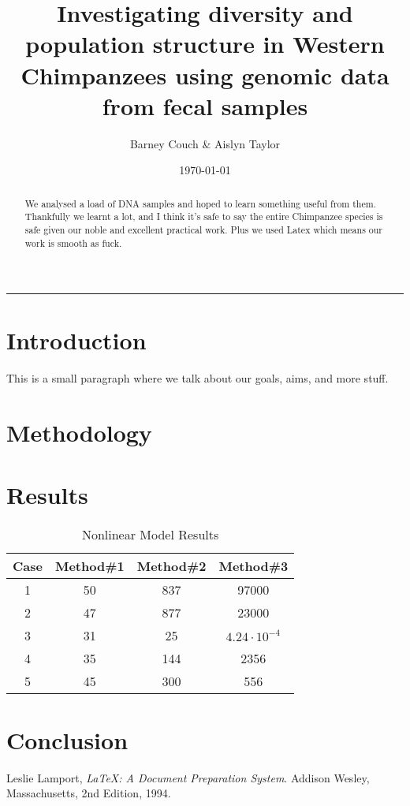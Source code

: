 \documentclass[11pt,a4paper,twoside]{article}
\begin{document}
\title{\bf Investigating diversity and population structure in Western Chimpanzees using genomic data from fecal samples}
\author{Barney Couch \& Aislyn Taylor}
\date{\today}
\maketitle

\hrule
\bigskip

\begin{abstract}
We analysed a load of DNA samples and hoped to learn something useful from them. Thankfully we learnt a lot, and I think it's safe to say the entire Chimpanzee species is safe given our noble and excellent practical work. Plus we used Latex \cite{lamport94} which means our work is smooth as fuck.
\end{abstract}


\section{Introduction}
This is a small paragraph where we talk about our goals, aims, and more stuff.

\section{Methodology}
\lipsum[2]

\section{Results}

\begin{table}[ht]
\caption{Nonlinear Model Results}
\bigskip
\centering
\begin{tabular}{c c c c}
\hline\hline
Case & Method\#1 & Method\#2 & Method\#3 \\ [0.5ex] %
\hline
1&50&837&97000 \\
2&47&877&23000\\
3&31&25 & $4.24 \cdot 10^{-4}$ \\
4 & 35 & 144 & 2356 \\
5 & 45 & 300 & 556 \\ [1ex]
\hline
\end{tabular}
\label{table:nonlin}
\end{table}

\lipsum[5]

\section{Conclusion}
\lipsum[4]

\begin{thebibliography}{9}

	  Leslie Lamport,
	  \emph{\LaTeX: A Document Preparation System}.
	  Addison Wesley, Massachusetts,
	  2nd Edition,
	  1994.

\end{thebibliography}
\end{document}
